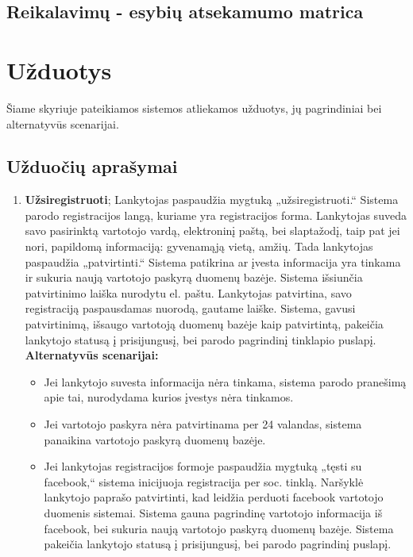 \documentclass{VUMIFPSkursinis}
\begin{document}
	\subsection{Reikalavimų - esybių atsekamumo matrica}
\section{Užduotys}
	Šiame skyriuje pateikiamos sistemos atliekamos užduotys, jų pagrindiniai bei alternatyvūs scenarijai.
	\subsection{Užduočių aprašymai}
		\begin{enumerate}[label=\textbf{U\arabic*.}]
			\item \textbf{Užsiregistruoti};		%
				Lankytojas paspaudžia mygtuką „užsiregistruoti.“ Sistema parodo registracijos langą, kuriame yra registracijos forma.
				Lankytojas suveda savo pasirinktą vartotojo vardą, elektroninį paštą, bei slaptažodį, taip pat jei nori, 
				papildomą informaciją: gyvenamąją vietą, amžių. Tada lankytojas paspaudžia „patvirtinti.“ 
				Sistema patikrina ar įvesta informacija yra tinkama ir sukuria naują vartotojo paskyrą duomenų bazėje.
				Sistema išsiunčia patvirtinimo laiška nurodytu el. paštu. 
				Lankytojas patvirtina, savo registraciją paspausdamas nuorodą, gautame laiške. Sistema, gavusi patvirtinimą, išsaugo vartotoją duomenų bazėje kaip patvirtintą,
				pakeičia lankytojo statusą į prisijungusį, bei parodo pagrindinį tinklapio puslapį.\\
				\textbf{Alternatyvūs scenarijai:}
				\begin{itemize}
					\item Jei lankytojo suvesta informacija nėra tinkama, sistema parodo pranešimą apie tai, nurodydama kurios įvestys nėra tinkamos.
					\item Jei vartotojo paskyra nėra patvirtinama per 24 valandas, sistema panaikina vartotojo paskyrą duomenų bazėje.
					\item Jei lankytojas registracijos formoje paspaudžia mygtuką „tęsti su facebook,“ sistema inicijuoja registracija per soc. tinklą.
	                    Naršyklė lankytojo paprašo patvirtinti, kad leidžia perduoti facebook vartotojo duomenis sistemai.
						Sistema gauna pagrindinę vartotojo informacija iš facebook, bei sukuria naują vartotojo paskyrą duomenų bazėje.
						Sistema pakeičia lankytojo statusą į prisijungusį, bei parodo pagrindinį puslapį.

\end{itemize}
\end{enumerate}
\end{document}
